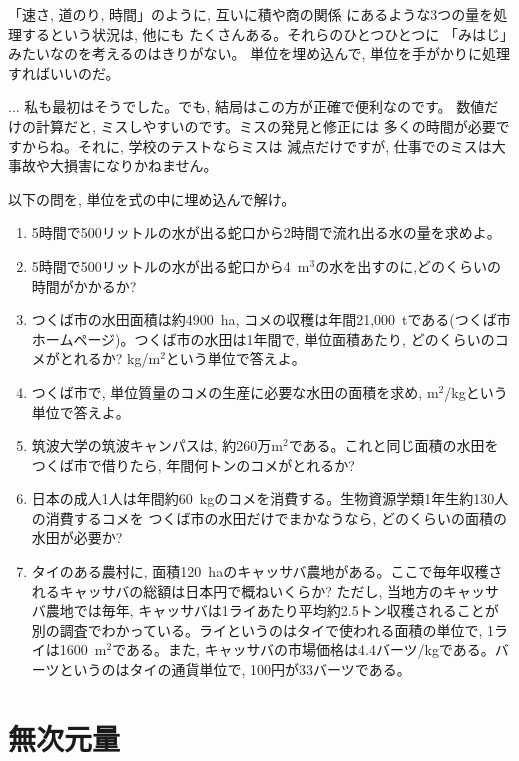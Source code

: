 「速さ, 道のり, 時間」のように, 互いに積や商の関係
にあるような3つの量を処理するという状況は, 他にも
たくさんある。それらのひとつひとつに
「みはじ」みたいなのを考えるのはきりがない。
単位を埋め込んで, 単位を手がかりに処理すればいいのだ。
\mv

\begin{faq}{\small{} ... 
私も最初はそうでした。でも, 結局はこの方が正確で便利なのです。
数値だけの計算だと, ミスしやすいのです。ミスの発見と修正には
多くの時間が必要ですからね。それに, 学校のテストならミスは
減点だけですが, 仕事でのミスは大事故や大損害になりかねません。}\end{faq}
\mv

\begin{q}\label{q:unit_mihaji} 以下の問を, 単位を式の中に埋め込んで解け。
\begin{enumerate}
\item 5時間で500リットルの水が出る蛇口から2時間で流れ出る水の量を求めよ。
\item 5時間で500リットルの水が出る蛇口から4~m$^3$の水を出すのに,どのくらいの時間がかかるか?
\item つくば市の水田面積は約4900~ha, コメの収穫は年間21,000~tである(つくば市ホームページ)。つくば市の水田は1年間で, 
単位面積あたり, どのくらいのコメがとれるか? kg/m$^2$という単位で答えよ。
\item つくば市で, 単位質量のコメの生産に必要な水田の面積を求め, m$^2$/kgという単位で答えよ。
\item 筑波大学の筑波キャンパスは, 約260万m$^2$である。これと同じ面積の水田をつくば市で借りたら, 
年間何トンのコメがとれるか?
\item 日本の成人1人は年間約60~kgのコメを消費する。生物資源学類1年生約130人の消費するコメを
つくば市の水田だけでまかなうなら, どのくらいの面積の水田が必要か?
\item タイのある農村に, 面積120~haのキャッサバ農地がある。ここで毎年収穫されるキャッサバの総額は日本円で概ねいくらか? ただし, 当地方のキャッサバ農地では毎年, キャッサバは1ライあたり平均約2.5トン収穫されることが別の調査でわかっている。ライというのはタイで使われる面積の単位で, 1ライは1600~m$^2$である。また, キャッサバの市場価格は4.4バーツ/kgである。バーツというのはタイの通貨単位で, 100円が33バーツである。
\end{enumerate}
\end{q}



\section{無次元量}

